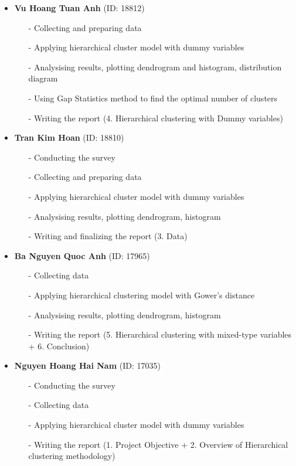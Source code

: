 \documentclass{tuna-report}
\begin{document}
\begin{itemize}
    \item \textbf{Vu Hoang Tuan Anh} (ID: 18812)
        \begin{itemize}
            \item[-] Collecting and preparing data
            \item[-] Applying hierarchical cluster model with dummy variables
            \item[-] Analysising results, plotting dendrogram and histogram, distribution diagram
            \item[-] Using Gap Statistics method to find the optimal number of clusters
            \item[-] Writing the report (4. Hierarchical clustering with Dummy variables)
        \end{itemize}
        
    \item \textbf{Tran Kim Hoan} (ID: 18810)
        \begin{itemize}
            \item[-] Conducting the survey
            \item[-] Collecting and preparing data
            \item[-] Applying hierarchical cluster model with dummy variables
            \item[-] Analysising results, plotting dendrogram, histogram
            \item[-] Writing and finalizing the report (3. Data)
        \end{itemize}
        
    \item \textbf{Ba Nguyen Quoc Anh} (ID: 17965)
        \begin{itemize}
            \item[-] Collecting data
            \item[-] Applying hierarchical clustering model with Gower's distance
            \item[-] Analysising results, plotting dendrogram, histogram
            \item[-] Writing the report (5. Hierarchical clustering with mixed-type variables + 6. Conclusion)
        \end{itemize}

    \item \textbf{Nguyen Hoang Hai Nam} (ID: 17035)
        \begin{itemize}
            \item[-] Conducting the survey
            \item[-] Collecting data
            \item[-] Applying hierarchical cluster model with dummy variables
            \item[-] Writing the report (1. Project Objective + 2. Overview of Hierarchical clustering methodology)
        \end{itemize}
\end{itemize}
\end{document}
